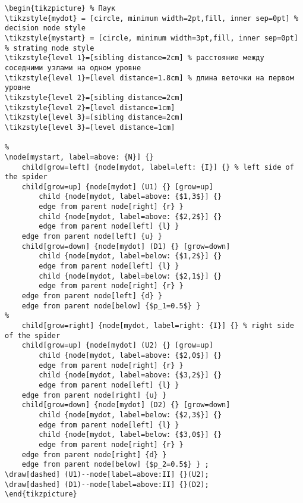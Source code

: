 \documentclass[12pt,a4paper]{article}
\begin{document}
\begin{verbatim}
\begin{tikzpicture} % Паук
\tikzstyle{mydot} = [circle, minimum width=2pt,fill, inner sep=0pt] % decision node style
\tikzstyle{mystart} = [circle, minimum width=3pt,fill, inner sep=0pt] % strating node style
\tikzstyle{level 1}=[sibling distance=2cm] % расстояние между соседними узлами на одном уровне
\tikzstyle{level 1}=[level distance=1.8cm] % длина веточки на первом уровне
\tikzstyle{level 2}=[sibling distance=2cm]
\tikzstyle{level 2}=[level distance=1cm]
\tikzstyle{level 3}=[sibling distance=2cm]
\tikzstyle{level 3}=[level distance=1cm]

%
\node[mystart, label=above: {N}] {}
    child[grow=left] {node[mydot, label=left: {I}] {} % left side of the spider
    child[grow=up] {node[mydot] (U1) {} [grow=up]
        child {node[mydot, label=above: {$1,3$}] {}
        edge from parent node[right] {r} }
        child {node[mydot, label=above: {$2,2$}] {}
        edge from parent node[left] {l} }
    edge from parent node[left] {u} }
    child[grow=down] {node[mydot] (D1) {} [grow=down]
        child {node[mydot, label=below: {$1,2$}] {}
        edge from parent node[left] {l} }
        child {node[mydot, label=below: {$2,1$}] {}
        edge from parent node[right] {r} }
    edge from parent node[left] {d} }
    edge from parent node[below] {$p_1=0.5$} }
%
    child[grow=right] {node[mydot, label=right: {I}] {} % right side of the spider
    child[grow=up] {node[mydot] (U2) {} [grow=up]
        child {node[mydot, label=above: {$2,0$}] {}
        edge from parent node[right] {r} }
        child {node[mydot, label=above: {$3,2$}] {}
        edge from parent node[left] {l} }
    edge from parent node[right] {u} }
    child[grow=down] {node[mydot] (D2) {} [grow=down]
        child {node[mydot, label=below: {$2,3$}] {}
        edge from parent node[left] {l} }
        child {node[mydot, label=below: {$3,0$}] {}
        edge from parent node[right] {r} }
    edge from parent node[right] {d} }
    edge from parent node[below] {$p_2=0.5$} } ;
\draw[dashed] (U1)--node[label=above:II] {}(U2);
\draw[dashed] (D1)--node[label=above:II] {}(D2);
\end{tikzpicture}
        
\end{verbatim}


\newpage
{}
\end{document}
